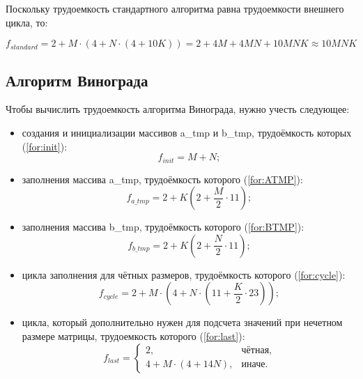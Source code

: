 Поскольку трудоемкость стандартного алгоритма равна трудоемкости внешнего цикла, то:

\begin{equation}
	\label{for:standard}
	f_{standard} = 2 + M \cdot (4 + N \cdot (4 + 10K)) = 2 + 4M + 4MN + 10MNK \approx 10MNK
\end{equation}


\subsection{Алгоритм Винограда}

Чтобы вычислить трудоемкость алгоритма Винограда, нужно учесть следующее: 

\begin{itemize}
	\item создания и инициализации массивов a\_tmp и b\_tmp, трудоёмкость которых (\ref{for:init}):
	\begin{equation}
		\label{for:init}
		f_{init} = M + N;
	\end{equation}
	
	\item заполнения массива a\_tmp, трудоёмкость которого (\ref{for:ATMP}):
	\begin{equation}
		\label{for:ATMP}
		f_{a\_tmp} = 2 + K (2 + \frac{M}{2} \cdot 11);
	\end{equation}
	
	\item заполнения массива b\_tmp, трудоёмкость которого (\ref{for:BTMP}):
	\begin{equation}
		\label{for:BTMP}
		f_{b\_tmp} = 2 + K (2 + \frac{N}{2} \cdot 11);
	\end{equation}
	
	\item цикла заполнения для чётных размеров, трудоёмкость которого (\ref{for:cycle}):
	\begin{equation}
		\label{for:cycle}
		f_{cycle} = 2 + M \cdot (4 + N \cdot (11 + \frac{K}{2} \cdot 23));
	\end{equation}
	
	\item цикла, который дополнительно нужен для подсчета значений при нечетном размере матрицы, трудоемкость которого (\ref{for:last}):
	\begin{equation}
		\label{for:last}
		f_{last} = \begin{cases}
			2, & \text{чётная,}\\
			4 + M \cdot (4 + 14N), & \text{иначе.}
		\end{cases}
	\end{equation}
\end{itemize}


